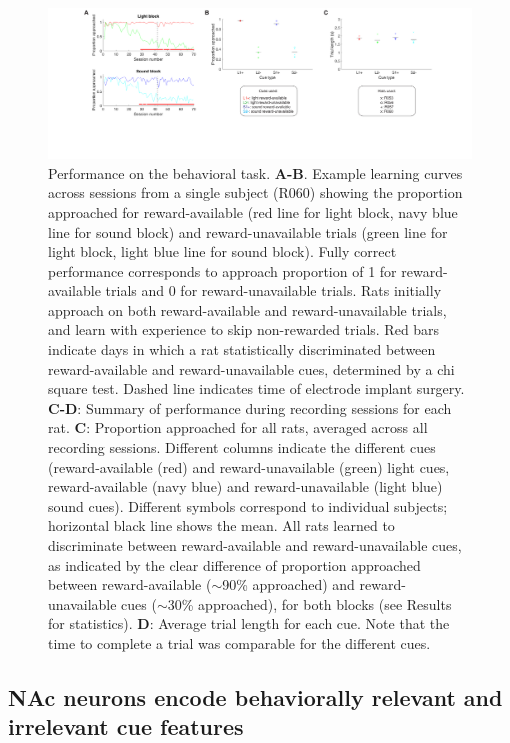 \documentclass[11pt]{article}
\newcommand{\bsf}[1]{\textbf{#1}}
\begin{document}
{\begin{figure}[h]
\centering
\includegraphics[width=\textwidth]{Fig 4 - Behavioral results.png}
\caption{Performance on the behavioral task. \bsf{A-B}. Example learning curves
  across sessions from a single subject (R060) showing the proportion approached
  for reward-available (red line for light block, navy blue line for sound
  block) and reward-unavailable trials (green line for light block, light blue
  line for sound block). Fully correct performance corresponds to approach
  proportion of 1 for reward-available trials and 0 for reward-unavailable
  trials. Rats initially approach on both reward-available and
  reward-unavailable trials, and learn with experience to skip non-rewarded
  trials. Red bars indicate days in which a rat statistically discriminated
  between reward-available and reward-unavailable cues, determined by a chi
  square test. Dashed line indicates time of electrode implant
  surgery. \bsf{C-D}: Summary of performance during recording sessions for each
  rat. \bsf{C}: Proportion approached for all rats, averaged across all
  recording sessions. Different columns indicate the different cues
  (reward-available (red) and reward-unavailable (green) light cues,
  reward-available (navy blue) and reward-unavailable (light blue) sound
  cues). Different symbols correspond to individual subjects; horizontal black
  line shows the mean. All rats learned to discriminate between reward-available
  and reward-unavailable cues, as indicated by the clear difference of
  proportion approached between reward-available ($\sim$90\% approached) and
  reward-unavailable cues ($\sim$30\% approached), for both blocks (see Results
  for statistics). \bsf{D}: Average trial length for each cue. Note that the
  time to complete a trial was comparable for the different cues.}
\label{fig:behav}
\end{figure}

\subsection*{NAc neurons encode behaviorally relevant and irrelevant cue features}

}
\end{document}
